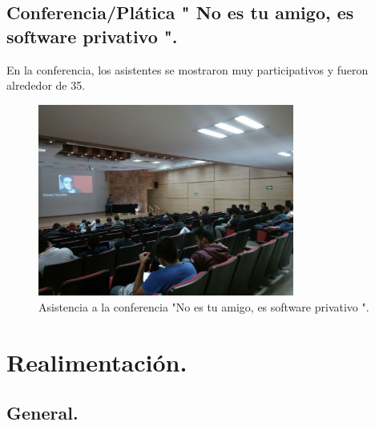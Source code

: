 \documentclass[a4paper,11pt]{article}                 %
\begin{document}
  \subsection{Conferencia/Plática " No es tu amigo, es software privativo ".}  
       En la conferencia, los asistentes se mostraron muy participativos y fueron alrededor de 35. 
         \begin{figure}[H]
    \begin{center}
      \includegraphics[width=0.75\textwidth]{images/privativo-01}
      \caption{Asistencia a la conferencia "No es tu amigo, es software privativo ".}
      \label{fig:privativo-01}
    \end{center}
  \end{figure}  
  
  \newpage
  
       \section{Realimentación.}
  \subsection{General.}
  
\end{document}
